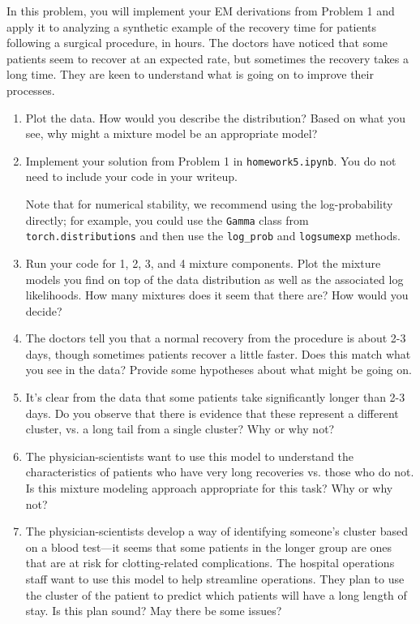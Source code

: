 \documentclass[submit]{../harvardml}
\begin{document}
\begin{problem}
  In this problem, you will implement your EM derivations from Problem
  1 and apply it to analyzing a synthetic example of the recovery time
  for patients following a surgical procedure, in hours.  The doctors
  have noticed that some patients seem to recover at an expected rate,
  but sometimes the recovery takes a long time.  They are keen to
  understand what is going on to improve their processes.  
  
  \begin{enumerate}
    \item Plot the data.  How would you describe the distribution?
    Based on what you see, why might a mixture model be an appropriate
    model?  
      
    \item Implement your solution from Problem 1 in \texttt{homework5.ipynb}. You do not need to include your code in your writeup.

    Note that for numerical stability, we recommend using the 
    log-probability directly; for example, you could use the \texttt{Gamma} class from \texttt{torch.distributions} and then use the \texttt{log\_prob} and \texttt{logsumexp} methods.

    \item Run your code for 1, 2, 3, and 4 mixture components.  Plot the
    mixture models you find on top of the data distribution as well as
    the associated log likelihoods.  How many mixtures does it seem that
    there are?  How would you decide?
  
    \item The doctors tell you that a normal recovery from the procedure
    is about 2-3 days, though sometimes patients recover a little
    faster.  Does this match what you see in the data?  Provide some
    hypotheses about what might be going on.

    \item It's clear from the data that some patients take significantly
    longer than 2-3 days.  Do you observe that there is evidence that
    these represent a different cluster, vs. a long tail from a single
    cluster?  Why or why not?

    \item The physician-scientists want to use this model to understand
    the characteristics of patients who have very long recoveries
    vs. those who do not.  Is this mixture modeling approach appropriate
    for this task?  Why or why not?

    \item The physician-scientists develop a way of identifying someone's
    cluster based on a blood test---it seems that some patients in the
    longer group are ones that are at risk for clotting-related
    complications.  The hospital operations staff want to use this model
    to help streamline operations.  They plan to use the cluster of the
    patient to predict which patients will have a long length of stay.
    Is this plan sound?  May there be some issues?
  \end{enumerate} 
\end{problem} 
\end{document}
